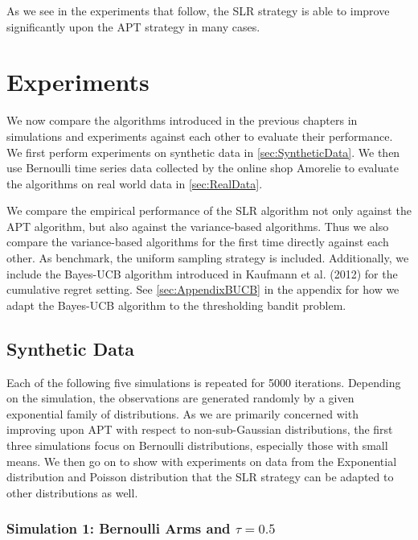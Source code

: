\documentclass[11pt,]{article}
\begin{document}
As we see in the experiments that follow, the SLR strategy is able to
improve significantly upon the APT strategy in many cases.

\newpage

\section{\texorpdfstring{Experiments
\label{chap:Experiments}}{Experiments }}\label{experiments}

We now compare the algorithms introduced in the previous chapters in
simulations and experiments against each other to evaluate their
performance. We first perform experiments on synthetic data in
\autoref{sec:SyntheticData}. We then use Bernoulli time series data
collected by the online shop Amorelie to evaluate the algorithms on real
world data in \autoref{sec:RealData}.

We compare the empirical performance of the SLR algorithm not only
against the APT algorithm, but also against the variance-based
algorithms. Thus we also compare the variance-based algorithms for the
first time directly against each other. As benchmark, the uniform
sampling strategy is included. Additionally, we include the Bayes-UCB
algorithm introduced in Kaufmann et al. (2012) for the cumulative regret
setting. See \autoref{sec:AppendixBUCB} in the appendix for how we adapt
the Bayes-UCB algorithm to the thresholding bandit problem.

\subsection{\texorpdfstring{Synthetic Data
\label{sec:SyntheticData}}{Synthetic Data }}\label{synthetic-data}

Each of the following five simulations is repeated for 5000 iterations.
Depending on the simulation, the observations are generated randomly by
a given exponential family of distributions. As we are primarily
concerned with improving upon APT with respect to non-sub-Gaussian
distributions, the first three simulations focus on Bernoulli
distributions, especially those with small means. We then go on to show
with experiments on data from the Exponential distribution and Poisson
distribution that the SLR strategy can be adapted to other distributions
as well.

\subsubsection{\texorpdfstring{Simulation 1: Bernoulli Arms and
\(\tau = 0.5\)}{Simulation 1: Bernoulli Arms and \textbackslash{}tau = 0.5}}\label{simulation-1-bernoulli-arms-and-tau-0.5}
\end{document}
